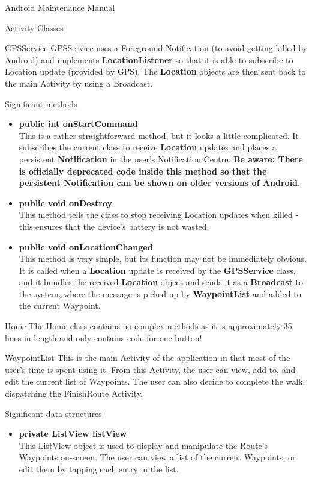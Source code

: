 \documentclass{article}
\begin{document}
\begin{section}{Android Maintenance Manual}
\begin{subsection}{Activity Classes}
		\begin{subsubsection}{GPSService}
			GPSService uses a Foreground Notification (to avoid getting killed by Android) and implements {\bf LocationListener} so that it is able to subscribe to Location update (provided by GPS). The {\bf Location} objects are then sent back to the main Activity by using a Broadcast.
			\begin{paragraph}{Significant methods}
				\begin{itemize}
					\item{{\bf public int onStartCommand} \\
					This is a rather straightforward method, but it looks a little complicated. It subscribes the current class to receive {\bf Location} updates and places a persistent {\bf Notification} in the user's Notification Centre. {\bf Be aware: There is officially deprecated code inside this method so that the persistent Notification can be shown on older versions of Android.}}
					\item{{\bf public void onDestroy} \\
					This method tells the class to stop receiving Location updates when killed - this ensures that the device's battery is not wasted.}
					\item{{\bf public void onLocationChanged} \\
					This method is very simple, but its function may not be immediately obvious. It is called when a {\bf Location} update is received by the {\bf GPSService} class, and it bundles the received {\bf Location} object and sends it as a {\bf Broadcast} to the system, where the message is picked up by {\bf WaypointList} and added to the current Waypoint.}
				\end{itemize}			
			\end{paragraph}
		\end{subsubsection}
		
		\begin{subsubsection}{Home}
			The Home class contains no complex methods as it is approximately 35 lines in length and only contains code for one button!
		\end{subsubsection}
		
		\newpage
		\begin{subsubsection}{WaypointList}
			This is the main Activity of the application in that most of the user's time is spent using it. From this Activity, the user can view, add to, and edit the current list of Waypoints. The user can also decide to complete the walk, dispatching the FinishRoute Activity.
			\begin{paragraph}{Significant data structures}
				\begin{itemize}
					\item{{\bf private ListView listView} \\
					This ListView object is used to display and manipulate the Route's Waypoints on-screen. The user can view a list of the current Waypoints, or edit them by tapping each entry in the list.}
				\end{itemize}
			\end{paragraph}
			

\end{subsubsection}
\end{subsection}
\end{section}
\end{document}
